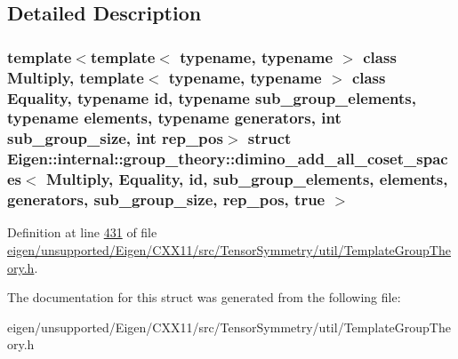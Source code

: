 \subsection{Detailed Description}
\subsubsection*{template$<$template$<$ typename, typename $>$ class Multiply, template$<$ typename, typename $>$ class Equality, typename id, typename sub\+\_\+group\+\_\+elements, typename elements, typename generators, int sub\+\_\+group\+\_\+size, int rep\+\_\+pos$>$\newline
struct Eigen\+::internal\+::group\+\_\+theory\+::dimino\+\_\+add\+\_\+all\+\_\+coset\+\_\+spaces$<$ Multiply, Equality, id, sub\+\_\+group\+\_\+elements, elements, generators, sub\+\_\+group\+\_\+size, rep\+\_\+pos, true $>$}



Definition at line \hyperlink{eigen_2unsupported_2_eigen_2_c_x_x11_2src_2_tensor_symmetry_2util_2_template_group_theory_8h_source_l00431}{431} of file \hyperlink{eigen_2unsupported_2_eigen_2_c_x_x11_2src_2_tensor_symmetry_2util_2_template_group_theory_8h_source}{eigen/unsupported/\+Eigen/\+C\+X\+X11/src/\+Tensor\+Symmetry/util/\+Template\+Group\+Theory.\+h}.



The documentation for this struct was generated from the following file\+:\begin{DoxyCompactItemize}
\item 
eigen/unsupported/\+Eigen/\+C\+X\+X11/src/\+Tensor\+Symmetry/util/\+Template\+Group\+Theory.\+h\end{DoxyCompactItemize}
